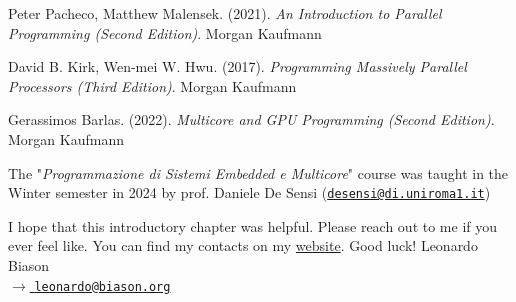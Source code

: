     \begin{thebibliography}{9}
         Peter Pacheco, Matthew Malensek. (2021). \emph{An Introduction to Parallel Programming (Second Edition)}. Morgan Kaufmann
        
         David B. Kirk, Wen-mei W. Hwu. (2017). \emph{Programming Massively Parallel Processors (Third Edition)}. Morgan Kaufmann

         Gerassimos Barlas. (2022). \emph{Multicore and GPU Programming (Second Edition)}. Morgan Kaufmann
    \end{thebibliography}
\endgroup

\begin{tcolorbox}[colback=Dandelion!25, colframe=Dandelion!50]
    \begin{center}
        The "\textit{Programmazione di Sistemi Embedded e Multicore}" course was taught in the Winter semester in 2024 by prof. Daniele De Sensi (\href{mailto:desensi@di.uniroma1.it}{\texttt{desensi@di.uniroma1.it}})
    \end{center}
\end{tcolorbox}

I hope that this introductory chapter was helpful. Please reach out to me if you ever feel like. You can find my contacts on my \href{https://www.leonardobiason.com}{website}. Good luck! \nl
Leonardo Biason\\
{\footnotesize \href{mailto:leonardo@biason.org}{$\to$ \texttt{leonardo@biason.org}}}
